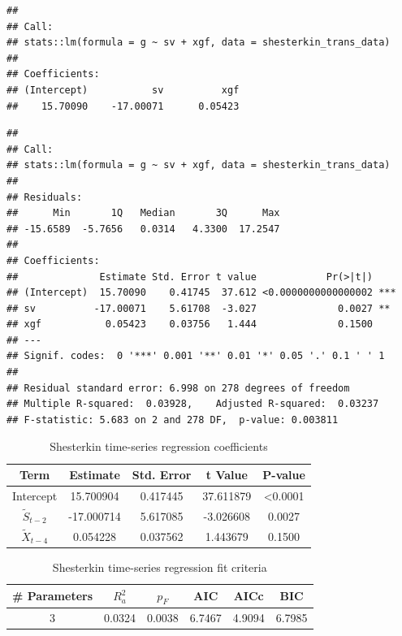 \documentclass[
  10pt,
]{extarticle}
\newenvironment{Shaded}{\begin{snugshade}}{\end{snugshade}}
\newcommand{\FunctionTok}[1]{\textcolor[rgb]{0.13,0.29,0.53}{\textbf{#1}}}
\newcommand{\NormalTok}[1]{#1}
\newcommand{\SpecialCharTok}[1]{\textcolor[rgb]{0.81,0.36,0.00}{\textbf{#1}}}
\begin{document}
\begin{verbatim}
## 
## Call:
## stats::lm(formula = g ~ sv + xgf, data = shesterkin_trans_data)
## 
## Coefficients:
## (Intercept)           sv          xgf  
##    15.70090    -17.00071      0.05423
\end{verbatim}

\begin{Shaded}
\end{Shaded}

\begin{verbatim}
## 
## Call:
## stats::lm(formula = g ~ sv + xgf, data = shesterkin_trans_data)
## 
## Residuals:
##      Min       1Q   Median       3Q      Max 
## -15.6589  -5.7656   0.0314   4.3300  17.2547 
## 
## Coefficients:
##              Estimate Std. Error t value            Pr(>|t|)    
## (Intercept)  15.70090    0.41745  37.612 <0.0000000000000002 ***
## sv          -17.00071    5.61708  -3.027              0.0027 ** 
## xgf           0.05423    0.03756   1.444              0.1500    
## ---
## Signif. codes:  0 '***' 0.001 '**' 0.01 '*' 0.05 '.' 0.1 ' ' 1
## 
## Residual standard error: 6.998 on 278 degrees of freedom
## Multiple R-squared:  0.03928,    Adjusted R-squared:  0.03237 
## F-statistic: 5.683 on 2 and 278 DF,  p-value: 0.003811
\end{verbatim}

\begin{center}
\scriptsize
\begin{table}[H]

\caption{\label{tab:p1-shesterkin-reg-coef}Shesterkin time-series regression coefficients}
\centering
\begin{tabular}[t]{ccccc}
\toprule
Term & Estimate & Std. Error & t Value & P-value\\
\midrule
Intercept & 15.700904 & 0.417445 & 37.611879 & <0.0001\\
$\tilde{S}_{t-2}$ & -17.000714 & 5.617085 & -3.026608 & 0.0027\\
$\tilde{X}_{t-4}$ & 0.054228 & 0.037562 & 1.443679 & 0.1500\\
\bottomrule
\end{tabular}
\end{table}
\normalsize
\end{center}

\begin{center}
\scriptsize
\begin{table}[H]

\caption{\label{tab:p1-shesterkin-reg-fit}Shesterkin time-series regression fit criteria}
\centering
\begin{tabular}[t]{cccccc}
\toprule
\# Parameters & $R_a^2$ & $p_F$ & AIC & AICc & BIC\\
\midrule
3 & 0.0324 & 0.0038 & 6.7467 & 4.9094 & 6.7985\\
\bottomrule
\end{tabular}
\end{table}
\normalsize
\end{center}
\end{document}
